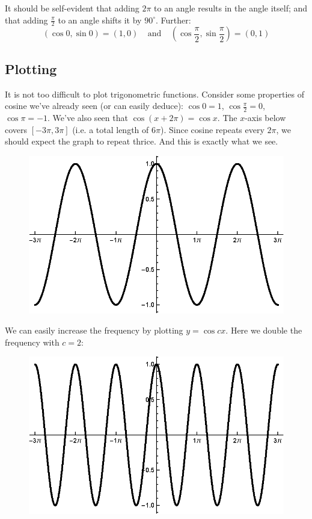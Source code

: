 \vs

It should be self-evident that adding $2\pi$ to an angle results in the
angle itself; and that adding $\frac{\pi}{2}$ to an angle shifts it by
$90^{\circ}$. Further:
\[(\cos 0,\sin 0)=(1,0)\ \ \ \ \ \text{and}\ \ \ \ \ (\cos \frac{\pi}{2},\sin \frac{\pi}{2})=(0,1)\]

\clearpage
\subsection{Plotting}
It is not too difficult to plot trigonometric functions. Consider some
properties of cosine we've already seen (or can easily deduce):
$\cos 0=1$, $\cos \frac{\pi}{2}=0$, $\cos \pi=-1$. We've also seen that
$\cos{(x+2\pi)}=\cos x$. The $x$-axis below covers $[-3\pi, 3\pi]$ (i.e. a
total length of $6\pi$). Since cosine repeats every $2\pi$, we should
expect the graph to repeat thrice. And this is exactly what we see.
\begin{figure}[htbp]
  \centering
  \includegraphics[width=.75\textwidth]{eps/prereqs/cosine.eps}
\end{figure}

We can easily increase the frequency by plotting $y=\cos cx$. Here we
double the frequency with $c=2$:
\begin{figure}[htbp]
  \centering
  \includegraphics[width=.75\textwidth]{eps/prereqs/cosine2x.eps}
\end{figure}

